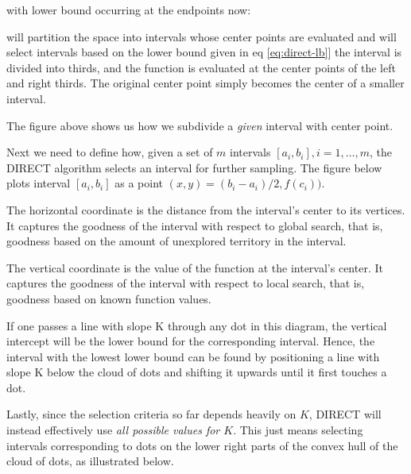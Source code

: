 \documentclass[11pt]{article}
\begin{document}
with lower bound occurring at the endpoints now:

\begin{myquote}[-1em]
	[DIRECT] will partition the space into intervals whose center points are evaluated and will select intervals based on the lower bound given in eq \ref{eq:direct-lb}] \textellipsis the interval is divided into thirds, and the function is evaluated at the center points of the left and right thirds. The original center point simply becomes the center of a smaller interval.
\end{myquote}


The figure above shows us how we subdivide a \textit{given} interval with center point. 

Next we need to define how, given a set of $m$ intervals $[a_i, b_i], i = 1, \ldots, m$, the DIRECT algorithm selects an interval for further sampling. The figure below plots interval $[a_i, b_i]$ as a point $(x, y) = (b_i - a_i)/2, f(c_i))$. 


\begin{compactitem}
	\item The horizontal coordinate is the distance from the interval's center to its vertices. It captures the goodness of the interval with respect to global search, that is, goodness based on the amount of unexplored territory in the interval. 
	
	\item The vertical coordinate is the value of the function at the interval's center. It captures the goodness of the interval with respect to local search, that is, goodness based on known function values. 
	
	\item If one passes a line with slope K through any dot in this diagram, the vertical intercept will be the lower bound for the corresponding interval. Hence, 
	the interval with the lowest lower bound can be found by positioning a line with slope K below the cloud of dots and shifting it upwards until it first touches a dot.
\end{compactitem}

Lastly, since the selection criteria so far depends heavily on $K$, DIRECT will instead effectively use \textit{all possible values for $K$}. This just means selecting intervals corresponding to dots on the lower right parts of the convex hull of the cloud of dots, as illustrated below. 
\end{document}
